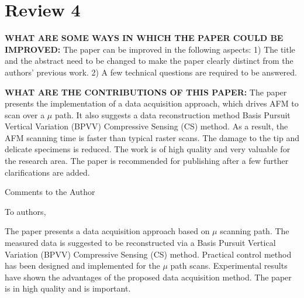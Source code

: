 \documentclass[11pt]{article} %
\begin{document}
\section{Review 4}
\textbf{WHAT ARE SOME WAYS IN WHICH THE PAPER COULD BE IMPROVED:} The paper can be improved in the following aspects:
1) The title and the abstract need to be changed to make the paper clearly distinct from the authors' previous work.
2) A few technical questions are required to be answered.

\textbf{WHAT ARE THE CONTRIBUTIONS OF THIS PAPER:} The paper presents the implementation of a data acquisition approach, which drives AFM to scan over a $\mu$ path. It also suggests a data reconstruction method Basis Pursuit Vertical Variation (BPVV) Compressive Sensing (CS) method. As a result, the AFM scanning time is faster than typical raster scans. The damage to the tip and delicate specimens is reduced. The work is of high quality and very valuable for the research area. The paper is recommended for publishing after a few further clarifications are added.

Comments to the Author

To authors,

The paper presents a data acquisition approach based on $\mu$ scanning path. The measured data is suggested to be reconstructed via a Basis Pursuit Vertical Variation (BPVV) Compressive Sensing (CS) method. Practical control method has been designed and implemented for the $\mu$ path scans. Experimental results have shown the advantages of the proposed data acquisition method. The paper is in high quality and is important.
\end{document}
